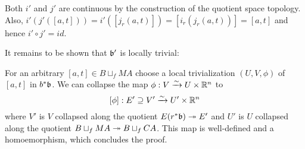\begin{myproof}
    Both $i'$ and $j'$ are continuous by the construction of the quotient space topology.
    Also, $i'(j'([a, t])) = i'([j_r(a, t)]) = [i_r(j_r(a, t))] = [a, t]$ and hence $i' \circ j' = id$.

    It remains to be shown that $\mathfrak{b}'$ is locally trivial:

    For an arbitrary $[a, t] \in B \sqcup_f MA$ choose a local trivialization $(U, V, \phi)$ of $[a, t]$ in $b^*\mathfrak{b}$.
    We can collapse the map $\phi: V \xrightarrow{\sim} U \times \mathbb{R}^n$ to
    \[ [\phi]: E' \supseteq{} V' \xrightarrow{\sim} U' \times \mathbb{R}^n \]
    where $V'$ is $V$ collapsed along the quotient $E(r^*\mathfrak{b}) \twoheadrightarrow{} E'$ and $U'$ is $U$ collapsed along the quotient $B \sqcup_f MA \twoheadrightarrow{} B \sqcup_f CA$.
    This map is well-defined and a homoemorphism, which concludes the proof.
\end{myproof}